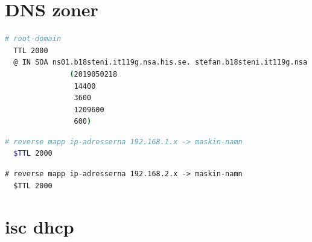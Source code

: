 \documentclass[swedish,10pt,a4paper]{article}
\begin{document}
\section{DNS zoner}\label{sec:appendix_dns_zones}

\begin{lstlisting}[language=sh,caption={/etc/bind/zones/db.b18steni.it119g.nsa.his.se}]
  # root-domain
  TTL 2000
  @ IN SOA ns01.b18steni.it119g.nsa.his.se. stefan.b18steni.it119g.nsa.his.se.
               (2019050218
                14400
                3600
                1209600
                600)
\end{lstlisting}

\begin{lstlisting}[language=sh,caption={/etc/bind/zones/db.1.168.192.in-addr.arpa}]
  # reverse mapp ip-adresserna 192.168.1.x -> maskin-namn
  $TTL 2000
\end{lstlisting}

\begin{lstlisting}[caption={/etc/bind/zones/db.2.168.192.in-addr.arpa}]
  # reverse mapp ip-adresserna 192.168.2.x -> maskin-namn
  $TTL 2000
\end{lstlisting}


\section{isc dhcp}\label{sec:appendix_isc_dhcpd_config}
\end{document}
